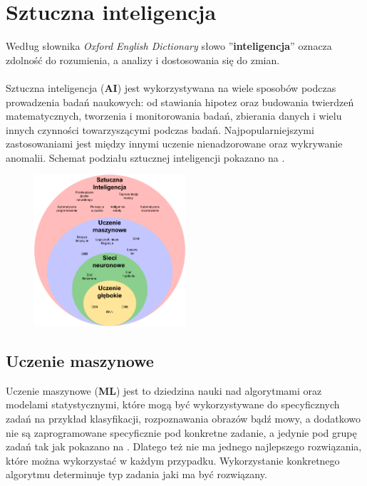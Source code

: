 \chapter{Sztuczna inteligencja}
Według słownika \textit{Oxford English Dictionary} słowo ''\textbf{inteligencja}'' oznacza zdolność do rozumienia, a analizy i dostosowania się do zmian\cite{OxfordJuly2023}.
\\ \\
Sztuczna inteligencja (\textbf{AI}) jest wykorzystywana na wiele sposobów podczas prowadzenia badań naukowych: od stawiania hipotez oraz budowania twierdzeń matematycznych, tworzenia i monitorowania badań, zbierania danych i wielu innych czynności towarzyszącymi podczas badań. Najpopularniejszymi zastosowaniami jest między innymi uczenie nienadzorowane oraz wykrywanie anomalii\cite{AiScience, Mahesh2018}. Schemat podziału sztucznej inteligencji pokazano na .

\begin{figure}[H]
    \centering
    \includegraphics[width=0.5\textwidth]{images/si}
    \label{fig:si-schema}
\end{figure}

\section{Uczenie maszynowe}
Uczenie maszynowe (\textbf{ML}) jest to dziedzina nauki nad algorytmami oraz modelami statystycznymi, które mogą być wykorzystywane do specyficznych zadań na przykład klasyfikacji, rozpoznawania obrazów bądź mowy, a dodatkowo nie są zaprogramowane specyficznie pod konkretne zadanie, a jedynie pod grupę zadań tak jak pokazano na . Dlatego też nie ma jednego najlepszego rozwiązania, które można wykorzystać w każdym przypadku. Wykorzystanie konkretnego algorytmu determinuje typ zadania jaki ma być rozwiązany.

